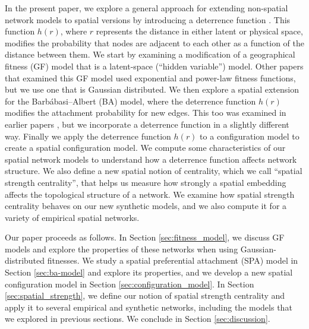 \documentclass[%
 reprint,
 amsmath,amssymb,
 aps,
]{revtex4-1}
\begin{document}




In the present paper, we explore a general approach for extending non-spatial network models to spatial versions by introducing a deterrence function \cite{community2}. This \\
 function $h(r)$, where $r$ represents the distance in either latent or physical space, modifies the probability that nodes are adjacent to each other as a function of the distance between them. We start by examining a modification of a geographical fitness (GF) model \cite{yusuke} that is a latent-space (``hidden variable'') model. Other papers that examined this GF model \cite{geographical_threshold, geographical_threshold2} used exponential and power-law fitness functions, but we use one that is Gaussian distributed. 
We then explore a spatial extension for the Barb\'abasi--Albert (BA) model, where the deterrence function $h(r)$ modifies the attachment probability for new edges. This too was examined in earlier papers \cite{SPA1, SPA2, SPA3}, but we incorporate a deterrence function in a slightly different way. Finally we apply the deterrence function $h(r)$ to a configuration model \cite{fosdick} to create a spatial configuration model.
We compute some characteristics of our spatial network models to understand how a deterrence function affects network structure.
We also define a new spatial notion of centrality, which we call ``spatial strength centrality'', that helps us measure how strongly a spatial embedding affects the topological structure of a network. 
We examine how spatial strength centrality behaves on our new synthetic models, and we also compute it for a variety of empirical spatial networks.

Our paper proceeds as follows. In Section \ref{sec:fitness_model}, we discuss GF models and explore the properties of these networks when using Gaussian-distributed fitnesses. We study a spatial preferential attachment (SPA) model in Section \ref{sec:ba-model} and explore its properties, and we develop a new spatial configuration model in Section \ref{sec:configuration_model}. In Section \ref{sec:spatial_strength}, we define our notion of spatial strength centrality and apply it to several empirical and synthetic networks, including the models that we explored in previous sections. We conclude in Section \ref{sec:discussion}.
\end{document}
